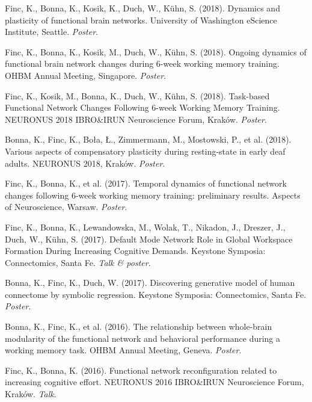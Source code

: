 \documentclass[10pt, a4paper]{article}
\newenvironment{cvlist}{%
  \begin{enumerate}[leftmargin=2em, label={[\arabic*]}, itemsep=0.25em, parsep=0pt]%
}{%
  \end{enumerate}%
}
\begin{document}
\begin{cvlist}
\item Finc, K., Bonna, K., Kosik, K., Duch, W., K\"uhn, S. (2018). Dynamics and plasticity of functional brain networks. University of Washington eScience Institute, Seattle. \textit{Poster}.

\item Finc, K., Bonna, K., Kosik, M., Duch, W., K\"uhn, S. (2018). Ongoing dynamics of functional brain network changes during 6-week working memory training. OHBM Annual Meeting, Singapore. \textit{Poster}.

\item Finc, K., Kosik, M., Bonna, K., Duch, W., K\"uhn, S. (2018). Task-based Functional Network Changes Following 6-week Working Memory Training. NEURONUS 2018 IBRO\&IRUN Neuroscience Forum, Krak\'ow. \textit{Poster}.

\item Bonna, K., Finc, K., Bo{\l}a, {\L}., Zimmermann, M., Mostowski, P., et al. (2018). Various aspects of compensatory plasticity during resting-state in early deaf adults. NEURONUS 2018, Krak\'ow. \textit{Poster}.

\item Finc, K., Bonna, K., et al. (2017). Temporal dynamics of functional network changes following 6-week working memory training: preliminary results. Aspects of Neuroscience, Warsaw. \textit{Poster}.

\item Finc, K., Bonna, K., Lewandowska, M., Wolak, T., Nikadon, J., Dreszer, J., Duch, W., K\"uhn, S. (2017). Default Mode Network Role in Global Workspace Formation During Increasing Cognitive Demands. Keystone Symposia: Connectomics, Santa Fe. \textit{Talk \& poster}.

\item Bonna, K., Finc, K., Duch, W. (2017). Discovering generative model of human connectome by symbolic regression. Keystone Symposia: Connectomics, Santa Fe. \textit{Poster}.

\item Bonna, K., Finc, K., et al. (2016). The relationship between whole-brain modularity of the functional network and behavioral performance during a working memory task. OHBM Annual Meeting, Geneva. \textit{Poster}.

\item Finc, K., Bonna, K. (2016). Functional network reconfiguration related to increasing cognitive effort. NEURONUS 2016 IBRO\&IRUN Neuroscience Forum, Krak\'ow. \textit{Talk}.


\end{cvlist}
\end{document}
